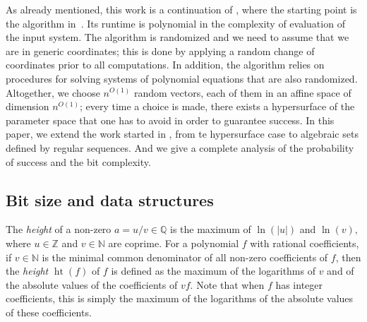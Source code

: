 \documentclass[a4paper]{article}
\DeclareMathOperator{\htt}{ht}
\def\Q{\mathbb{Q}}
\begin{document}
As already mentioned, this work is a continuation of \cite{ElGiSh20}, where the starting point is the algorithm in~\cite{EMP}. Its runtime is  polynomial in the
complexity of evaluation of the input system. The algorithm is randomized and we need to assume
that we are in generic coordinates; this is done by applying a random
change of coordinates prior to all computations. In addition, the
algorithm relies on procedures for solving systems of polynomial
equations that are also randomized.  Altogether, we choose
$n^{O(1)}$ random vectors, each of them in an affine space of
dimension $n^{O(1)}$; every time a choice is made, there exists a
hypersurface of the parameter space that one has to avoid in order to
guarantee success. In this paper, we extend the work started in \cite{ElGiSh20}, from te hypersurface case to algebraic sets defined by regular sequences. And we give a
complete analysis of the probability of success and the bit complexity.








\subsection{Bit size and data structures}
The {\em height} of a non-zero $a=u/v \in \Q$ is the maximum of
$\ln(|u|)$ and $\ln(v),$ where $u \in \mathbb{Z}$ and $v \in
\mathbb{N}$ are coprime. For a polynomial $f$ with rational
coefficients, if $v \in \mathbb N$ is the minimal common denominator
of all non-zero coefficients of $f$, then the \textit{height}
$\htt(f)$ of $f$ is defined as the maximum of the logarithms of $v$
and of the absolute values of the coefficients of $vf$. Note that when $f$ has integer coefficients, this is simply the maximum of the logarithms of the absolute values
of these coefficients.
\end{document}
